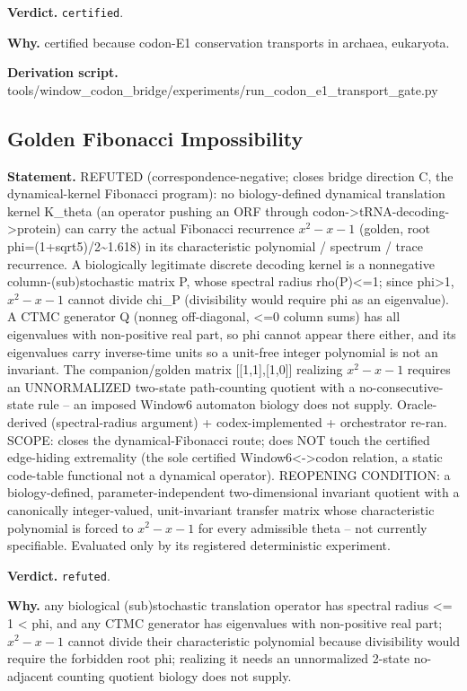 \textbf{Verdict.} \texttt{certified}.

\textbf{Why.} certified because codon-E1 conservation transports in archaea, eukaryota.

\textbf{Derivation script.} tools/window\_codon\_bridge/experiments/run\_codon\_e1\_transport\_gate.py

\subsection{Golden Fibonacci Impossibility}\label{sec:bridge-golden-fibonacci-impossibility}
\textbf{Statement.} REFUTED (correspondence-negative; closes bridge direction C, the dynamical-kernel Fibonacci
program): no biology-defined dynamical translation kernel K\_theta (an operator pushing an ORF
through codon->tRNA-decoding->protein) can carry the actual Fibonacci recurrence $x^2-x-1$ (golden,
root phi=(1+sqrt5)/2\textasciitilde{}1.618) in its characteristic polynomial / spectrum / trace
recurrence. A biologically legitimate discrete decoding kernel is a nonnegative
column-(sub)stochastic matrix P, whose spectral radius rho(P)<=1; since phi>1, $x^2-x-1$ cannot
divide chi\_P (divisibility would require phi as an eigenvalue). A CTMC generator Q (nonneg
off-diagonal, <=0 column sums) has all eigenvalues with non-positive real part, so phi cannot appear
there either, and its eigenvalues carry inverse-time units so a unit-free integer polynomial is not
an invariant. The companion/golden matrix [[1,1],[1,0]] realizing $x^2-x-1$ requires an UNNORMALIZED
two-state path-counting quotient with a no-consecutive-state rule -- an imposed Window6 automaton
biology does not supply. Oracle-derived (spectral-radius argument) + codex-implemented +
orchestrator re-ran. SCOPE: closes the dynamical-Fibonacci route; does NOT touch the certified
edge-hiding extremality (the sole certified Window6<->codon relation, a static code-table functional
not a dynamical operator). REOPENING CONDITION: a biology-defined, parameter-independent
two-dimensional invariant quotient with a canonically integer-valued, unit-invariant transfer matrix
whose characteristic polynomial is forced to $x^2-x-1$ for every admissible theta -- not currently
specifiable. Evaluated only by its registered deterministic experiment.

\textbf{Verdict.} \texttt{refuted}.

\textbf{Why.} any biological (sub)stochastic translation operator has spectral radius <= 1 < phi, and any CTMC
generator has eigenvalues with non-positive real part; $x^2-x-1$ cannot divide their characteristic
polynomial because divisibility would require the forbidden root phi; realizing it needs an
unnormalized 2-state no-adjacent counting quotient biology does not supply.

